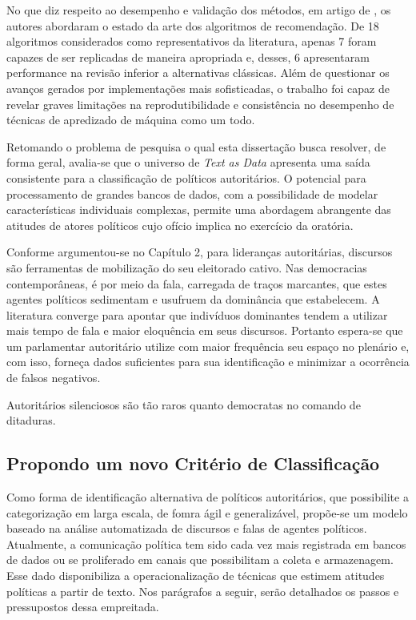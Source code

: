 \documentclass[
12pt,				%
openright,			%
twoside,			%
a4paper,			%
english,			%
french,				%
spanish,			%
brazil				%
]{abntex2}
\begin{document}
No que diz respeito ao desempenho e validação dos métodos, em artigo de , os autores abordaram o estado da arte dos algoritmos de recomendação. De 18 algoritmos considerados como representativos da literatura, apenas 7 foram capazes de ser replicadas de maneira apropriada e, desses, 6 apresentaram performance na revisão inferior a alternativas clássicas. Além de questionar os avanços gerados por implementações mais sofisticadas, o trabalho foi capaz de revelar graves limitações na reprodutibilidade e consistência no desempenho de técnicas de apredizado de máquina como um todo.  

Retomando o problema de pesquisa o qual esta dissertação busca resolver, de forma geral, avalia-se que o universo de \emph{Text as Data} apresenta uma saída consistente para a classificação de políticos autoritários. O potencial para processamento de grandes bancos de dados, com a possibilidade de modelar características individuais complexas, permite uma abordagem abrangente das atitudes de atores políticos cujo ofício implica no exercício da oratória.

Conforme argumentou-se no Capítulo 2, para lideranças autoritárias, discursos são ferramentas de mobilização do seu eleitorado cativo. Nas democracias contemporâneas, é por meio da fala, carregada de traços marcantes, que estes agentes políticos sedimentam e usufruem da dominância que estabelecem. A literatura converge para apontar que indivíduos dominantes tendem a utilizar mais tempo de fala e maior eloquência em seus discursos. Portanto espera-se que um parlamentar autoritário utilize com maior frequência seu espaço no plenário e, com isso, forneça dados suficientes para sua identificação e minimizar a ocorrência de falsos negativos. 

Autoritários silenciosos são tão raros quanto democratas no comando de ditaduras. 

\subsection{Propondo um novo Critério de Classificação}

Como forma de identificação alternativa de políticos autoritários, que possibilite a categorização em larga escala, de fomra ágil e generalizável, propõe-se um modelo baseado na análise automatizada de discursos e falas de agentes políticos. Atualmente, a comunicação política tem sido cada vez mais registrada em bancos de dados ou se proliferado em canais que possibilitam a coleta e armazenagem. Esse dado disponibiliza a operacionalização de técnicas que estimem atitudes políticas a partir de texto. Nos parágrafos a seguir, serão detalhados os passos e pressupostos dessa empreitada. 
\end{document}
